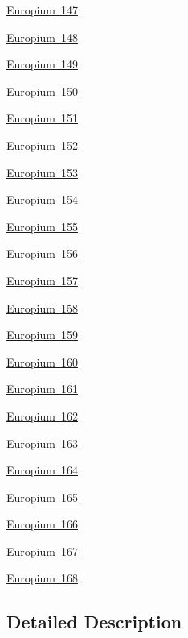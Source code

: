 \begin{DoxyCompactItemize}
\mbox{\hyperlink{group___isotope_const-_europium-_eu147}{Europium 147}}
\item 
\mbox{\hyperlink{group___isotope_const-_europium-_eu148}{Europium 148}}
\item 
\mbox{\hyperlink{group___isotope_const-_europium-_eu149}{Europium 149}}
\item 
\mbox{\hyperlink{group___isotope_const-_europium-_eu150}{Europium 150}}
\item 
\mbox{\hyperlink{group___isotope_const-_europium-_eu151}{Europium 151}}
\item 
\mbox{\hyperlink{group___isotope_const-_europium-_eu152}{Europium 152}}
\item 
\mbox{\hyperlink{group___isotope_const-_europium-_eu153}{Europium 153}}
\item 
\mbox{\hyperlink{group___isotope_const-_europium-_eu154}{Europium 154}}
\item 
\mbox{\hyperlink{group___isotope_const-_europium-_eu155}{Europium 155}}
\item 
\mbox{\hyperlink{group___isotope_const-_europium-_eu156}{Europium 156}}
\item 
\mbox{\hyperlink{group___isotope_const-_europium-_eu157}{Europium 157}}
\item 
\mbox{\hyperlink{group___isotope_const-_europium-_eu158}{Europium 158}}
\item 
\mbox{\hyperlink{group___isotope_const-_europium-_eu159}{Europium 159}}
\item 
\mbox{\hyperlink{group___isotope_const-_europium-_eu160}{Europium 160}}
\item 
\mbox{\hyperlink{group___isotope_const-_europium-_eu161}{Europium 161}}
\item 
\mbox{\hyperlink{group___isotope_const-_europium-_eu162}{Europium 162}}
\item 
\mbox{\hyperlink{group___isotope_const-_europium-_eu163}{Europium 163}}
\item 
\mbox{\hyperlink{group___isotope_const-_europium-_eu164}{Europium 164}}
\item 
\mbox{\hyperlink{group___isotope_const-_europium-_eu165}{Europium 165}}
\item 
\mbox{\hyperlink{group___isotope_const-_europium-_eu166}{Europium 166}}
\item 
\mbox{\hyperlink{group___isotope_const-_europium-_eu167}{Europium 167}}
\item 
\mbox{\hyperlink{group___isotope_const-_europium-_eu168}{Europium 168}}
\end{DoxyCompactItemize}


\subsection{Detailed Description}

